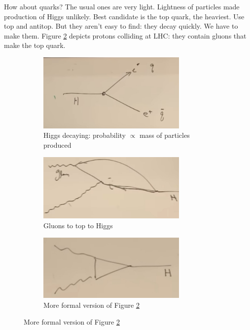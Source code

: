 \documentclass[]{article}
\begin{document}
\begin{appendices}
	How about quarks? The usual ones are very light. Lightness of particles made production of Higgs unlikely. Best candidate is the top quark, the heaviest. Use top and antitop. But they aren't easy to find: they decay quickly. We have to make them. Figure \ref{fig:2-a3-gluons} depicts protons colliding at LHC: they contain gluons that make the top quark. 
	
	\begin{figure}[H]
		\caption{How to make a Higgs}
		\begin{subfigure}[t]{0.3\textwidth}
			\caption{Higgs decaying: probability $\propto$ mass of particles produced}\label{fig:2-a3-higgs-decay}
			\includegraphics[width=0.8\textwidth]{2-a3-higgs-decay}
		\end{subfigure}
		\begin{subfigure}[t]{0.3\textwidth}
			\caption{Gluons to top to Higgs}\label{fig:2-a3-gluons}
			\includegraphics[width=0.8\textwidth]{2-a3-gluons}
		\end{subfigure}
		\begin{subfigure}[t]{0.3\textwidth}
			\caption{More formal version of Figure \ref{fig:2-a3-gluons} }\label{fig:2-a3-higgs-neat}
			\includegraphics[width=0.8\textwidth]{2-a3-higgs-neat}
		\end{subfigure}
	\end{figure}
	

\end{appendices}
\end{document}
